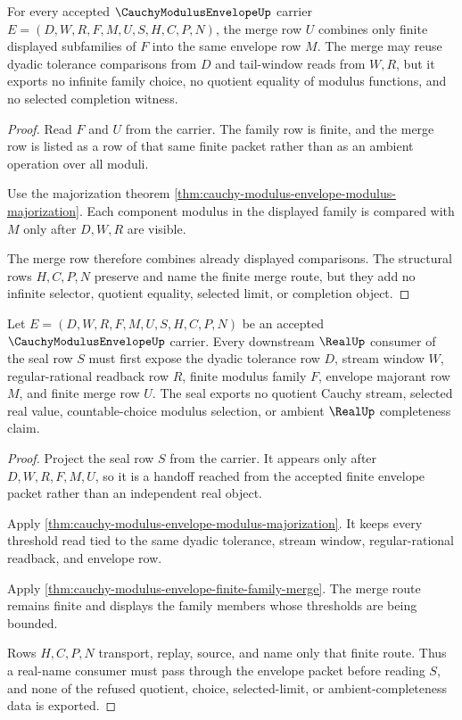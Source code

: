 \begin{theorem}
\label{thm:cauchy-modulus-envelope-finite-family-merge}
For every accepted $\CauchyModulusEnvelopeUp$ carrier $E=(D,W,R,F,M,U,S,H,C,P,N)$, the merge row $U$ combines only finite displayed subfamilies of $F$ into the same envelope row $M$. The merge may reuse dyadic tolerance comparisons from $D$ and tail-window reads from $W,R$, but it exports no infinite family choice, no quotient equality of modulus functions, and no selected completion witness.
\end{theorem}
\begin{proof}
Read $F$ and $U$ from the carrier. The family row is finite, and the merge row is listed as a row of that same finite packet rather than as an ambient operation over all moduli.

Use the majorization theorem \autoref{thm:cauchy-modulus-envelope-modulus-majorization}. Each component modulus in the displayed family is compared with $M$ only after $D,W,R$ are visible.

The merge row therefore combines already displayed comparisons. The structural rows $H,C,P,N$ preserve and name the finite merge route, but they add no infinite selector, quotient equality, selected limit, or completion object.
\end{proof}

\begin{theorem}
\label{thm:cauchy-modulus-envelope-real-seal-nonescape}
Let $E=(D,W,R,F,M,U,S,H,C,P,N)$ be an accepted $\CauchyModulusEnvelopeUp$ carrier. Every downstream $\RealUp$ consumer of the seal row $S$ must first expose the dyadic tolerance row $D$, stream window $W$, regular-rational readback row $R$, finite modulus family $F$, envelope majorant row $M$, and finite merge row $U$. The seal exports no quotient Cauchy stream, selected real value, countable-choice modulus selection, or ambient $\RealUp$ completeness claim.
\end{theorem}
\begin{proof}
Project the seal row $S$ from the carrier. It appears only after $D,W,R,F,M,U$, so it is a handoff reached from the accepted finite envelope packet rather than an independent real object.

Apply \autoref{thm:cauchy-modulus-envelope-modulus-majorization}. It keeps every threshold read tied to the same dyadic tolerance, stream window, regular-rational readback, and envelope row.

Apply \autoref{thm:cauchy-modulus-envelope-finite-family-merge}. The merge route remains finite and displays the family members whose thresholds are being bounded.

Rows $H,C,P,N$ transport, replay, source, and name only that finite route. Thus a real-name consumer must pass through the envelope packet before reading $S$, and none of the refused quotient, choice, selected-limit, or ambient-completeness data is exported.
\end{proof}

